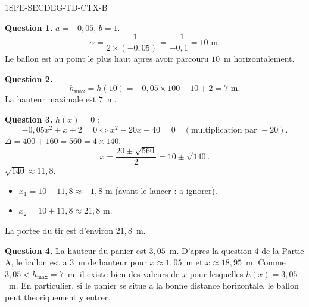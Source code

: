 
\begin{corrige}{1SPE-SECDEG-TD-CTX-B}


\textbf{Question 1.} $a = -0{,}05$, $b = 1$.
\[
\alpha = \frac{-1}{2 \times (-0{,}05)} = \frac{-1}{-0{,}1} = 10 \text{ m}.
\]
Le ballon est au point le plus haut apres avoir parcouru $10$~m horizontalement.

\textbf{Question 2.}
\[
h_{\max} = h(10) = -0{,}05 \times 100 + 10 + 2 = 7 \text{ m}.
\]
La hauteur maximale est $7$~m.

\textbf{Question 3.} $h(x) = 0$ :
\[
-0{,}05x^2 + x + 2 = 0 \Longleftrightarrow x^2 - 20x - 40 = 0 \quad (\text{multiplication par } -20).
\]
$\Delta = 400 + 160 = 560 = 4 \times 140$.
\[
x = \frac{20 \pm \sqrt{560}}{2} = 10 \pm \sqrt{140}.
\]
$\sqrt{140} \approx 11{,}8$.
\begin{itemize}
  \item $x_1 = 10 - 11{,}8 \approx -1{,}8$ m (avant le lancer : a ignorer).
  \item $x_2 = 10 + 11{,}8 \approx 21{,}8$ m.
\end{itemize}
La portee du tir est d'environ $21{,}8$~m.


\textbf{Question 4.} La hauteur du panier est $3{,}05$~m. D'apres la question 4 de la Partie A, le ballon est a $3$~m de hauteur pour $x \approx 1{,}05$~m et $x \approx 18{,}95$~m. Comme $3{,}05 < h_{\max} = 7$~m, il existe bien des valeurs de $x$ pour lesquelles $h(x) = 3{,}05$~m. En particulier, si le panier se situe a la bonne distance horizontale, le ballon peut theoriquement y entrer.

\end{corrige}

